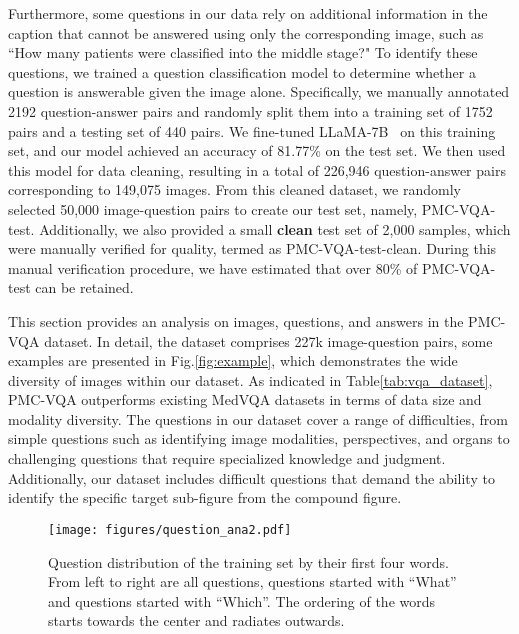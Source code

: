 \documentclass{article}
\begin{document}
Furthermore, some questions in our data rely on additional information in the caption that cannot be answered using only the corresponding image, such as ``How many patients were classified into the middle stage?" 
To identify these questions, we trained a question classification model to determine whether a question is answerable given the image alone. Specifically, we manually annotated 2192 question-answer pairs and randomly split them into a training set of 1752 pairs and a testing set of 440 pairs. We fine-tuned LLaMA-7B~\cite{touvron2023llama} on this training set, and our model achieved an accuracy of 81.77\% on the test set. 
We then used this model for data cleaning, resulting in a total of 226,946 question-answer pairs corresponding to 149,075 images. From this cleaned dataset, we randomly selected 50,000 image-question pairs to create our test set, namely, PMC-VQA-test. 
Additionally, we also provided a small \textbf{clean} test set of 2,000 samples, which were manually verified for quality, 
termed as PMC-VQA-test-clean. During this manual verification procedure, 
we have estimated that over 80\% of PMC-VQA-test can be retained.

This section provides an analysis on images, questions, and answers in the PMC-VQA dataset. In detail, the dataset comprises 227k image-question pairs, some examples are presented in Fig.\ref{fig:example}, which demonstrates the wide diversity of images within our dataset. 
As indicated in Table\ref{tab:vqa_dataset}, PMC-VQA outperforms existing MedVQA datasets in terms of data size and modality diversity. The questions in our dataset cover a range of difficulties, from simple questions such as identifying image modalities, perspectives, and organs to challenging questions that require specialized knowledge and judgment. Additionally, our dataset includes difficult questions that demand the ability to identify the specific target sub-figure from the compound figure.



\begin{figure}[t]
    \centering
    \texttt{[image: figures/question\_ana2.pdf]}
    \caption{Question distribution of the training set by their first four words. From left to right are all questions, questions started with ``What'' and questions started with ``Which''.
    The ordering of the words starts towards the center and radiates outwards. }
    \vspace{-0.3cm}
    \label{fig:question_distribution}
\end{figure}
\end{document}
